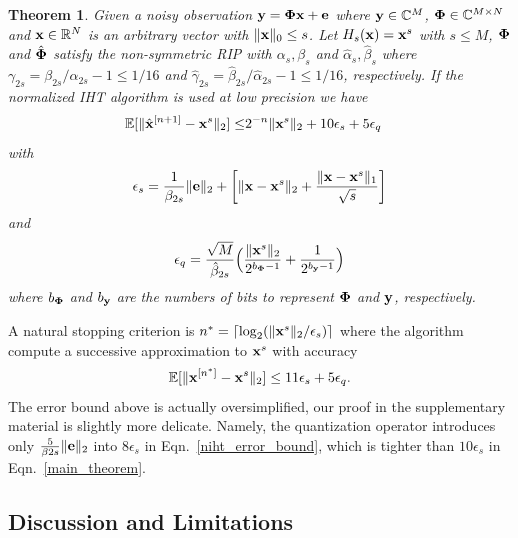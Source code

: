 \documentclass{article}
\newtheorem{theorem}{Theorem}
\begin{document}
\begin{theorem}\label{main_theorem_TH}
Given a noisy observation ${\bf y} = {\bf \Phi x}+{\bf e} $ where ${\bf y} \in \mathbb{C}^M$, ${\bf \Phi} \in \mathbb{C}^{M\times N}$ and ${\bf x} \in \mathbb{R}^N$ is an arbitrary vector with $\|{\bf x} \|_0 \leq s$. Let $H_s({\bf x}) = {\bf x}^s$ with $s\leq M$, ${\bf \Phi}$ and $\hat{\bf \Phi}$ satisfy the non-symmetric RIP with ${\alpha}_s, {\beta}_s$ and $\hat{\alpha}_s, \hat{\beta}_s$ where ${\gamma}_{2s} = {\beta}_{2s}/{\alpha}_{2s} -1 \leq 1/16$ and $\hat{\gamma}_{2s} = \hat{\beta}_{2s}/\hat{\alpha}_{2s} -1 \leq 1/16$, respectively. If the normalized IHT algorithm is used at low precision we have
\begin{equation}\label{main_theorem}
\begin{split}
        \mathbb{E}[\|\hat{{\bf x}}^{[n+1]}-{\bf x}^s\|_2]  
        \leq &2^{-n}\|{\bf x}^{s}\|_2  + 10 {\epsilon}_s + 5 {\epsilon}_q
\end{split}
\end{equation}
with 
\begin{equation}
 {\epsilon}_s = \frac{1}{\beta_{2s}}\|{\bf e} \|_2 +\bigg  [ \|{\bf x}-{\bf x}^s \|_2 + \frac{\|{\bf x}-{\bf x}^s \|_1}{\sqrt{s}}\bigg]    
\end{equation}
and
\begin{equation}
 {\epsilon}_q = \frac{\sqrt{M}}{\hat{\beta}_{2s}}\Big ( \frac{\| {\bf x}^s\|_2}{2^{b_{\bf \Phi}-1}}+\frac{1}{2^{b_{\bf y}-1}} \Big )
\end{equation}
where $b_{\bf \Phi}$ and $b_{\bf y}$ are the numbers of bits to represent ${\bf \Phi}$ and ${\bf y}$, respectively.
\end{theorem}
\vspace{-.5em}
A natural stopping criterion is $n^* = \lceil \log_2 (\|{\bf x}^s \|_2/\epsilon_s)\rceil$ where the algorithm compute a successive approximation to ${\bf x}^s$ with accuracy
\begin{equation}
    \mathbb{E}[\|{\bf x}^{[n^*]}-{\bf x}^s \|_2] \leq 11\epsilon_s + 5\epsilon_q.
\end{equation}
The error bound above is actually oversimplified, our proof in the supplementary material is slightly more delicate. Namely, the quantization operator introduces only $\frac{5}{\beta
{2s}} \|{\bf e} \|_2$ into $8 {\epsilon}_s$ in Eqn.~\ref{niht_error_bound}, which is tighter than $10 {\epsilon}_s$ in Eqn.~\ref{main_theorem}.

\vspace{-.5em}
\subsection{Discussion and Limitations}
\vspace{-0.5em}
\end{document}
